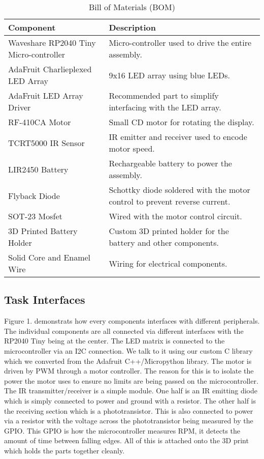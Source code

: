 \documentclass[11pt,journal]{IEEEtran}
\begin{document}
\begin{table}[h]
\centering
\caption{Bill of Materials (BOM)}
\begin{tabular}{|p{3cm}|p{5cm}|}
\hline
\textbf{Component} & \textbf{Description} \\
\hline
Waveshare RP2040 Tiny Micro-controller & Micro-controller used to drive the entire assembly. \\
\hline
AdaFruit Charlieplexed LED Array & 9x16 LED array using blue LEDs. \\
\hline
AdaFruit LED Array Driver & Recommended part to simplify interfacing with the LED array. \\
\hline
RF-410CA Motor & Small CD motor for rotating the display. \\
\hline
TCRT5000 IR Sensor & IR emitter and receiver used to encode motor speed. \\
\hline
LIR2450 Battery & Rechargeable battery to power the assembly. \\
\hline
Flyback Diode & Schottky diode soldered with the motor control to prevent reverse current. \\
\hline
SOT-23 Mosfet & Wired with the motor control circuit. \\
\hline
3D Printed Battery Holder & Custom 3D printed holder for the battery and other components. \\
\hline
Solid Core and Enamel Wire & Wiring for electrical components. \\
\hline
\end{tabular}

\end{table}

\subsection{Task Interfaces}

Figure 1. demonstrats how every components interfaces with different peripherals. The individual components are all connected via different interfaces with the RP2040 Tiny being at the center. The LED matrix is connected to the microcontroller via an I2C connection. We talk to it using our custom C library which we converted from the Adafruit C++/Micropython library. The motor is driven by PWM through a motor controller. The reason for this is to isolate the power the motor uses to ensure no limits are being passed on the microcontroller. The IR transmitter/receiver is a simple module. One half is an IR emitting diode which is simply connected to power and ground with a resistor. The other half is the receiving section which is a phototransistor. This is also connected to power via a resistor with the voltage across the phototransistor being measured by the GPIO. This GPIO is how the microcontroller measures RPM, it detects the amount of time between falling edges. All of this is attached onto the 3D print which holds the parts together cleanly.
\end{document}
